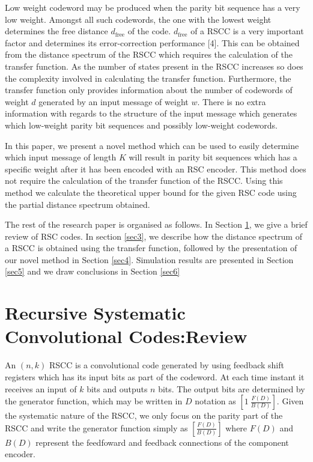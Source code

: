 \documentclass[conference]{IEEEtran}
\begin{document}
Low weight codeword may be produced when the parity bit sequence has a very low weight. Amongst all such codewords, the one with the lowest weight determines the free distance $d_{\text{free}}$ of the code. 
$d_{\text{free}}$  of a RSCC is a very important factor and determines its error-correction performance [4].  This can be obtained from the distance spectrum of the RSCC which requires the calculation of the transfer function. %
 As the number of states present in the RSCC increases so does the complexity involved in calculating the transfer function. Furthermore, the transfer function only provides information about the number of codewords of weight $d$ generated by an input message of weight $w$. There is no extra information with regards to the structure of the input message which generates which low-weight parity bit sequences and possibly low-weight codewords.

In this paper, we present a novel method which can be used to easily determine which input message of length $K$ will result in parity bit sequences which has a specific weight after it has been encoded with an RSC encoder. This method does not require the calculation of the transfer function of the RSCC. Using this method we calculate the theoretical upper bound for the given RSC code using the partial distance spectrum obtained. 

The rest of the research paper is organised as follows. In Section \ref{sec2}, we give a brief review of RSC codes. In section \ref{sec3}, we describe how the distance spectrum of a RSCC is obtained using the transfer function, followed by the presentation of our novel method in Section \ref{sec4}. Simulation results are presented in Section \ref{sec5} and we draw conclusions in Section \ref{sec6}


\section{Recursive Systematic Convolutional Codes:Review}
\label{sec2}

An $(n,k)$ RSCC is a convolutional code generated by using feedback shift registers which has its input bits as part of the codeword. At each time instant it receives an input of $k$ bits and outputs $n$ bits. The output bits are determined by the generator function, which may be written in $D$ notation as  $[1 ~\frac{F(D)}{B(D)}]$. Given the systematic nature of the RSCC, we only focus on the parity part of the RSCC and write the generator function simply as $[\frac{F(D)}{B(D)}]$ where $F(D)$ and $B(D)$ represent the feedfoward and feedback connections of the component encoder.  
\end{document}
